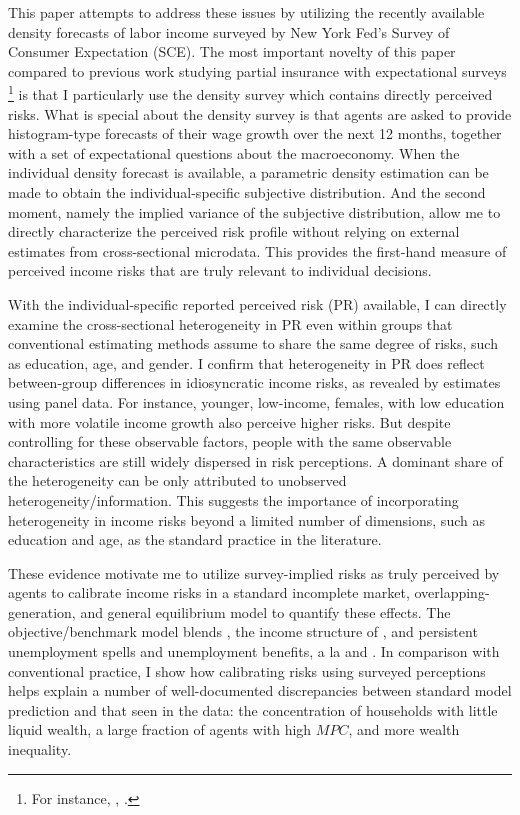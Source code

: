 
This paper attempts to address these issues by utilizing the recently available density forecasts of labor income surveyed by New York Fed's Survey of Consumer Expectation (SCE). The most important novelty of this paper compared to previous work studying partial insurance with expectational surveys \footnote{For instance, \cite{pistaferri_superior_2001}, \cite{kaufmann_disentangling_2009}.} is that I particularly use the density survey which contains directly perceived risks.  What is special about the density survey is that agents are asked to provide histogram-type forecasts of their wage growth over the next 12 months, together with a set of expectational questions about the macroeconomy. When the individual density forecast is available, a parametric density estimation can be made to obtain the individual-specific subjective distribution. And the second moment, namely the implied variance of the subjective distribution, allow me to directly characterize the perceived risk profile without relying on external estimates from cross-sectional microdata. This provides the first-hand measure of perceived income risks that are truly relevant to individual decisions.

With the individual-specific reported perceived risk (PR) available, I can directly examine the cross-sectional heterogeneity in PR even within groups that conventional estimating methods assume
to share the same degree of risks, such as education, age, and gender. I confirm that heterogeneity in PR does reflect between-group differences in idiosyncratic income risks, as revealed by estimates using panel data. For instance, younger, low-income, females, with low education with more volatile income growth also perceive higher risks. But despite controlling for these observable factors, people with the same observable characteristics are still widely dispersed in risk perceptions. A dominant
share of the heterogeneity can be only attributed to unobserved heterogeneity/information. This suggests the importance of incorporating heterogeneity in income risks beyond a limited number of dimensions, such as education and age, as the standard practice in the literature.


These evidence motivate me to utilize survey-implied risks as truly perceived by agents to calibrate income risks in a standard incomplete market, overlapping-generation, and general equilibrium model to quantify these effects. The objective/benchmark model blends \cite{huggett1996wealth}, the income structure of \cite{carroll1997nature}, and persistent unemployment spells and unemployment benefits, a la \cite{krueger2016macroeconomics} and \cite{carroll2017distribution}. In comparison with conventional practice, I show how calibrating risks using surveyed perceptions helps explain a number of well-documented discrepancies between standard model prediction and that seen in the data: the concentration of households with little liquid wealth, a large fraction of agents with high $MPC$, and more wealth inequality. 

